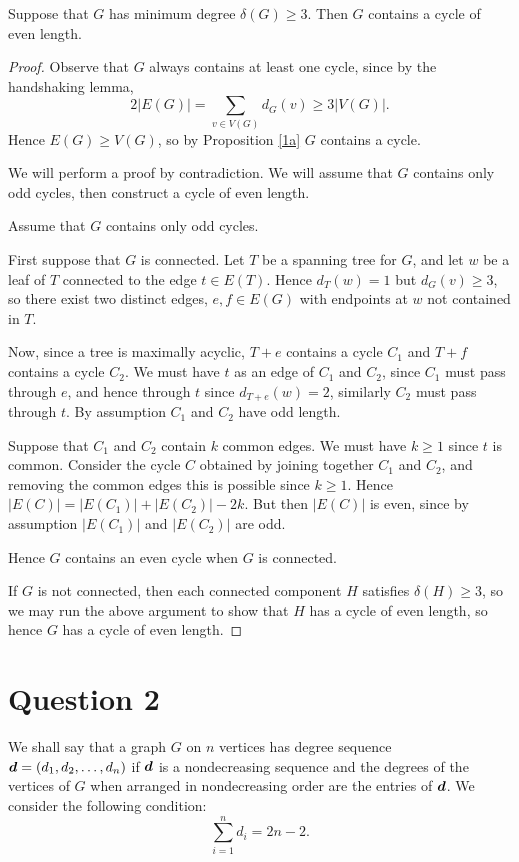 \documentclass{unswmaths}
\begin{document}
\begin{proposition}[Part (c)]
    Suppose that $G$ has minimum degree $\delta(G) \geq 3$. Then $G$ contains
    a cycle of even length.
\end{proposition}
\begin{proof}
    Observe that $G$ always contains at least one cycle, since
    by the handshaking lemma,
    \begin{equation}
        2|E(G)| = \sum_{v \in V(G)} d_G(v) \geq 3|V(G)|.
    \end{equation}
    Hence $E(G) \geq V(G)$, so by Proposition \ref{1a} $G$ contains a cycle.
    
    We will perform a proof by contradiction. We will assume that $G$ contains only
    odd cycles, then construct a cycle of even length.
    
    Assume that $G$ contains only odd cycles.
    
    First suppose that $G$ is connected. Let $T$ be a spanning tree for $G$,
    and let $w$ be a leaf of $T$ connected to the edge $t \in E(T)$. Hence $d_T(w) = 1$ but $d_G(v) \geq 3$,
    so there exist two distinct edges, $e,f \in E(G)$ with endpoints at $w$
    not contained in $T$.
    
    Now, since a tree is maximally acyclic, $T+e$ contains a cycle $C_1$
    and $T+f$ contains a cycle $C_2$. We must have $t$ as an edge of $C_1$
    and $C_2$, since $C_1$ must pass through $e$, and hence through $t$
    since $d_{T+e}(w) = 2$,
    similarly $C_2$ must pass through $t$. By assumption $C_1$
    and $C_2$ have odd length.
    
    Suppose that $C_1$ and $C_2$ contain $k$ common edges. 
    We must have $k \geq 1$ since $t$ is common.
    Consider the cycle $C$ obtained by joining together $C_1$ and $C_2$, and
    removing the common edges this is possible since $k \geq 1$. Hence $|E(C)| = |E(C_1)|+|E(C_2)|-2k$.
    But then $|E(C)|$ is even, since by assumption $|E(C_1)|$ and $|E(C_2)|$
    are odd.
    
    Hence $G$ contains an even cycle when $G$ is connected.
    
    If $G$ is not connected, then each connected component $H$
    satisfies $\delta(H) \geq 3$, so we may run the above argument
    to show that $H$ has a cycle of even length, so hence $G$
    has a cycle of even length.
   
\end{proof}

\section*{Question 2}
We shall say that a graph $G$ on $n$ vertices has degree sequence $\boldsymbol{d} = (d_1,d_2,\ldots,d_n)$
if $\boldsymbol{d}$ is a nondecreasing sequence and the degrees
of the vertices of $G$ when arranged in nondecreasing order are the entries of $\boldsymbol{d}$.
We consider the following condition:
\begin{equation}\tag{*}
\label{star}
\sum_{i=1}^n d_i = 2n-2.
\end{equation}
\end{document}
